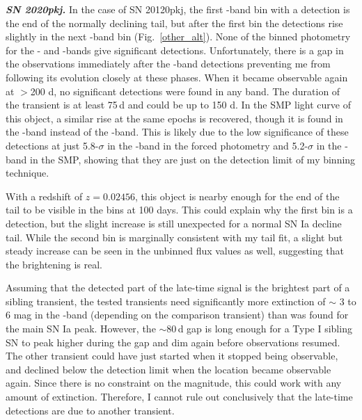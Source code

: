 \documentclass[a4paper,oneside,12pt, class=Latex/Classes/PhDthesisPSnPDF, crop=false]{standalone}
\begin{document}
\textit{\textbf{SN 2020pkj.}}
In the case of SN 20120pkj, the first \ztfr-band bin with a detection is the end of the normally declining tail, but after the first bin the detections rise slightly in the next \ztfr-band bin (Fig.~\ref{other_alt}). None of the binned photometry for the \ztfg- and \ztfi-bands give significant detections. Unfortunately, there is a gap in the observations immediately after the \ztfr-band detections preventing me from following its evolution closely at these phases. When it became observable again at $>$200 d, no significant detections were found in any band. The duration of the transient is at least 75\,d and could be up to 150 d. In the SMP light curve of this object, a similar rise at the same epochs is recovered, though it is found in the \ztfg-band instead of the \ztfr-band. This is likely due to the low significance of these detections at just 5.8-$\sigma$ in the \ztfr-band in the forced photometry and 5.2-$\sigma$ in the \ztfg-band in the SMP, showing that they are just on the detection limit of my binning technique.

With a redshift of $z = 0.02456$, this object is nearby enough for the end of the tail to be visible in the bins at 100 days. This could explain why the first bin is a detection, but the slight increase is still unexpected for a normal SN Ia decline tail. While the second bin is marginally consistent with my tail fit, a slight but steady increase can be seen in the unbinned flux values as well, suggesting that the brightening is real.

Assuming that the detected part of the late-time signal is the brightest part of a sibling transient, the tested transients need significantly more extinction of $\sim$ 3 to 6 mag in the \ztfr-band (depending on the comparison transient) than was found for the main SN Ia peak. However, the $\sim 80$\,d gap is long enough for a Type I sibling SN to peak higher during the gap and dim again before observations resumed. The other transient could have just started when it stopped being observable, and declined below the detection limit when the location became observable again. Since there is no constraint on the magnitude, this could work with any amount of extinction. Therefore, I cannot rule out conclusively that the late-time detections are due to another transient.
\end{document}
